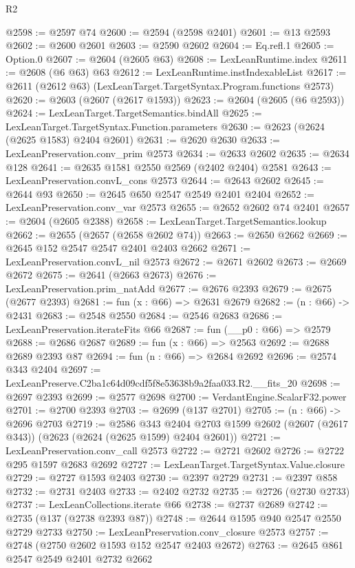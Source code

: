\begin{lexlean}{R2}
\begin{coremodule}
@2598 := @2597 @74
@2600 := @2594 (@2598 @2401)
@2601 := @13 @2593
@2602 := @2600 @2601
@2603 := @2590 @2602
@2604 := Eq.refl.{1}
@2605 := Option.{0}
@2607 := @2604 (@2605 @63)
@2608 := LexLeanRuntime.index
@2611 := @2608 (@6 @63) @63
@2612 := LexLeanRuntime.instIndexableList
@2617 := @2611 (@2612 @63) (LexLeanTarget.TargetSyntax.Program.functions @2573)
@2620 := @2603 (@2607 (@2617 @1593))
@2623 := @2604 (@2605 (@6 @2593))
@2624 := LexLeanTarget.TargetSemantics.bindAll
@2625 := LexLeanTarget.TargetSyntax.Function.parameters
@2630 := @2623 (@2624 (@2625 @1583) @2404 @2601)
@2631 := @2620 @2630
@2633 := LexLeanPreservation.conv_prim @2573
@2634 := @2633 @2602
@2635 := @2634 @128
@2641 := @2635 @1581 @2550 @2569 (@2402 @2404) @2581
@2643 := LexLeanPreservation.convL_cons @2573
@2644 := @2643 @2602
@2645 := @2644 @93
@2650 := @2645 @650 @2547 @2549 @2401 @2404
@2652 := LexLeanPreservation.conv_var @2573
@2655 := @2652 @2602 @74 @2401
@2657 := @2604 (@2605 @2388)
@2658 := LexLeanTarget.TargetSemantics.lookup
@2662 := @2655 (@2657 (@2658 @2602 @74))
@2663 := @2650 @2662
@2669 := @2645 @152 @2547 @2547 @2401 @2403 @2662
@2671 := LexLeanPreservation.convL_nil @2573
@2672 := @2671 @2602
@2673 := @2669 @2672
@2675 := @2641 (@2663 @2673)
@2676 := LexLeanPreservation.prim_natAdd
@2677 := @2676 @2393
@2679 := @2675 (@2677 @2393)
@2681 := fun (x : @66) => @2631 @2679
@2682 := (n : @66) -> @2431
@2683 := @2548 @2550
@2684 := @2546 @2683
@2686 := LexLeanPreservation.iterateFits @66
@2687 := fun (__p0 : @66) => @2579
@2688 := @2686 @2687
@2689 := fun (x : @66) => @2563
@2692 := @2688 @2689 @2393 @87
@2694 := fun (n : @66) => @2684 @2692
@2696 := @2574 @343 @2404
@2697 := LexLeanPreserve.C2ba1c64d09cdf5f8e53638b9a2faa033.R2.__fits_20
@2698 := @2697 @2393
@2699 := @2577 @2698
@2700 := VerdantEngine.ScalarF32.power
@2701 := @2700 @2393
@2703 := @2699 (@137 @2701)
@2705 := (n : @66) -> @2696 @2703
@2719 := @2586
    @343
    @2404
    @2703
    @1599
    @2602
    (@2607 (@2617 @343))
    (@2623 (@2624 (@2625 @1599) @2404 @2601))
@2721 := LexLeanPreservation.conv_call @2573
@2722 := @2721 @2602
@2726 := @2722 @295 @1597 @2683 @2692
@2727 := LexLeanTarget.TargetSyntax.Value.closure
@2729 := @2727 @1593 @2403
@2730 := @2397 @2729
@2731 := @2397 @858
@2732 := @2731 @2403
@2733 := @2402 @2732
@2735 := @2726 (@2730 @2733)
@2737 := LexLeanCollections.iterate @66
@2738 := @2737 @2689
@2742 := @2735 (@137 (@2738 @2393 @87))
@2748 := @2644 @1595 @940 @2547 @2550 @2729 @2733
@2750 := LexLeanPreservation.conv_closure @2573
@2757 := @2748 (@2750 @2602 @1593 @152 @2547 @2403 @2672)
@2763 := @2645 @861 @2547 @2549 @2401 @2732 @2662

\end{coremodule}
\end{lexlean}
